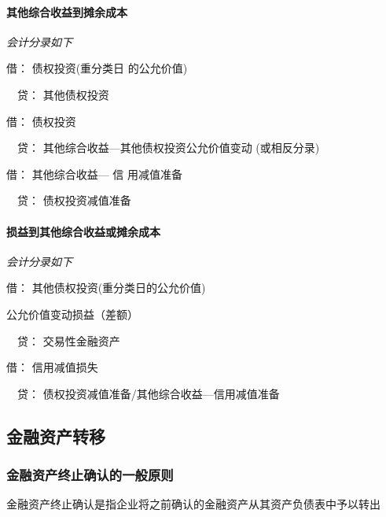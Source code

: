 \documentclass[UTF8,12pt]{ctexart}
\newenvironment{Dr}{\noindent 借：}{\par}
\newenvironment{Cr}{\noindent \ \ 贷：}{\par}
\numberwithin{equation}{section} %
\numberwithin{figure}{section}
\numberwithin{table}{section}
\begin{document}
	
	\paragraph{其他综合收益到摊余成本}\textit{会计分录如下}
	
	\begin{Dr}
		债权投资(重分类日
		的公允价值)
	\end{Dr}
	\begin{Cr}
		其他债权投资
	\end{Cr}
	
	\begin{Dr}
		债权投资
	\end{Dr}
	\begin{Cr}
		其他综合收益—其他债权投资公允价值变动 (或相反分录)
	\end{Cr}
	
	\begin{Dr}
		其他综合收益— 信 用减值准备
	\end{Dr}
	\begin{Cr}
		债权投资减值准备
	\end{Cr}
	
	
	\paragraph{损益到其他综合收益或摊余成本}\textit{会计分录如下}
	
	\begin{Dr}
		其他债权投资(重分类日的公允价值)
		
		公允价值变动损益（差额）
	\end{Dr}
	\begin{Cr}
		交易性金融资产
	\end{Cr}
	
	\begin{Dr}
		信用减值损失  
	\end{Dr}
	\begin{Cr}
		债权投资减值准备/其他综合收益—信用减值准备
	\end{Cr}
	
	
	\subsection{金融资产转移}
	\subsubsection{金融资产终止确认的一般原则}
	金融资产终止确认是指企业将之前确认的金融资产从其资产负债表中予以转出
	
\end{document}
